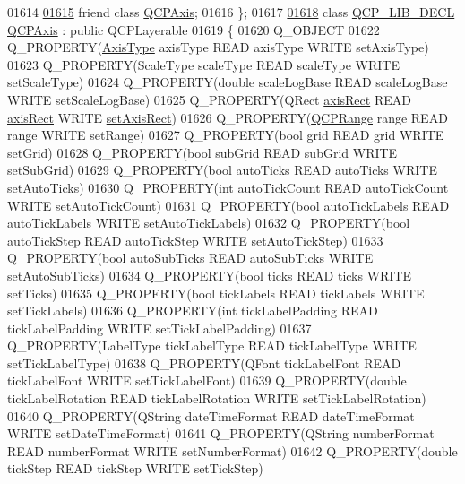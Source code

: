 \begin{DoxyCode}
01614   
\hypertarget{a00116_source_l01615}{}\hyperlink{a00116_a1f3cf57518867648e4f239eb18977a44}{01615}   \textcolor{keyword}{friend} \textcolor{keyword}{class }\hyperlink{a00025}{QCPAxis};
01616 \};
01617 
\hypertarget{a00116_source_l01618}{}\hyperlink{a00025}{01618} \textcolor{keyword}{class }\hyperlink{a00116_a5eaab02224a642ded7fb8951e973a02c}{QCP\_LIB\_DECL} \hyperlink{a00025}{QCPAxis} : \textcolor{keyword}{public} QCPLayerable
01619 \{
01620   Q\_OBJECT
01622   Q\_PROPERTY(\hyperlink{a00025_ae2bcc1728b382f10f064612b368bc18a}{AxisType} axisType READ axisType WRITE setAxisType)
01623   Q\_PROPERTY(ScaleType scaleType READ scaleType WRITE setScaleType)
01624   Q\_PROPERTY(\textcolor{keywordtype}{double} scaleLogBase READ scaleLogBase WRITE setScaleLogBase)
01625   Q\_PROPERTY(QRect \hyperlink{a00116_ad1541f59ff23332e3245b74af2fd3833}{axisRect} READ \hyperlink{a00116_ad1541f59ff23332e3245b74af2fd3833}{axisRect} WRITE \hyperlink{a00116_a5de3a26b172b17e1f0e35bfc596d9d4d}{setAxisRect})
01626   Q\_PROPERTY(\hyperlink{a00049}{QCPRange} range READ range WRITE setRange)
01627   Q\_PROPERTY(\textcolor{keywordtype}{bool} grid READ grid WRITE setGrid)
01628   Q\_PROPERTY(\textcolor{keywordtype}{bool} subGrid READ subGrid WRITE setSubGrid)
01629   Q\_PROPERTY(\textcolor{keywordtype}{bool} autoTicks READ autoTicks WRITE setAutoTicks)
01630   Q\_PROPERTY(\textcolor{keywordtype}{int} autoTickCount READ autoTickCount WRITE setAutoTickCount)
01631   Q\_PROPERTY(\textcolor{keywordtype}{bool} autoTickLabels READ autoTickLabels WRITE setAutoTickLabels)
01632   Q\_PROPERTY(\textcolor{keywordtype}{bool} autoTickStep READ autoTickStep WRITE setAutoTickStep)
01633   Q\_PROPERTY(\textcolor{keywordtype}{bool} autoSubTicks READ autoSubTicks WRITE setAutoSubTicks)
01634   Q\_PROPERTY(\textcolor{keywordtype}{bool} ticks READ ticks WRITE setTicks)
01635   Q\_PROPERTY(\textcolor{keywordtype}{bool} tickLabels READ tickLabels WRITE setTickLabels)
01636   Q\_PROPERTY(\textcolor{keywordtype}{int} tickLabelPadding READ tickLabelPadding WRITE setTickLabelPadding)
01637   Q\_PROPERTY(LabelType tickLabelType READ tickLabelType WRITE setTickLabelType)
01638   Q\_PROPERTY(QFont tickLabelFont READ tickLabelFont WRITE setTickLabelFont)
01639   Q\_PROPERTY(\textcolor{keywordtype}{double} tickLabelRotation READ tickLabelRotation WRITE setTickLabelRotation)
01640   Q\_PROPERTY(QString dateTimeFormat READ dateTimeFormat WRITE setDateTimeFormat)
01641   Q\_PROPERTY(QString numberFormat READ numberFormat WRITE setNumberFormat)
01642   Q\_PROPERTY(\textcolor{keywordtype}{double} tickStep READ tickStep WRITE setTickStep)

\end{DoxyCode}
